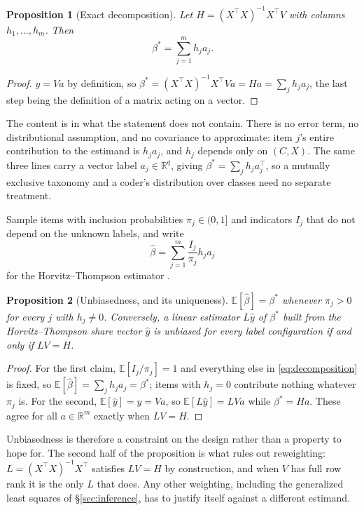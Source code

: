 \documentclass[11pt]{article}
\newcommand{\E}{\mathbb{E}}
\theoremstyle{plain}
\newtheorem{proposition}{Proposition}
\theoremstyle{remark}
\begin{document}
\begin{proposition}[Exact decomposition]
\label{prop:decomposition}
Let $H=(X^\top X)^{-1}X^\top V$ with columns $h_1,\dots,h_m$. Then
\begin{equation}
\label{eq:decomposition}
\beta^*=\sum_{j=1}^m h_j a_j .
\end{equation}
\end{proposition}

\begin{proof}
$y=Va$ by definition, so $\beta^*=(X^\top X)^{-1}X^\top Va=Ha=\sum_j h_ja_j$, the last step being the definition of a matrix acting on a vector.
\end{proof}

The content is in what the statement does not contain. There is no error term, no distributional assumption, and no covariance to approximate: item $j$'s entire contribution to the estimand is $h_ja_j$, and $h_j$ depends only on $(C,X)$. The same three lines carry a vector label $a_j\in\mathbb{R}^q$, giving $\beta^*=\sum_jh_ja_j^\top$, so a mutually exclusive taxonomy and a coder's distribution over classes need no separate treatment.

Sample items with inclusion probabilities $\pi_j\in(0,1]$ and indicators $I_j$ that do not depend on the unknown labels, and write
\begin{equation}
\label{eq:ht}
\widehat\beta=\sum_{j=1}^m \frac{I_j}{\pi_j}h_j a_j
\end{equation}
for the Horvitz--Thompson estimator \citep{HorvitzThompson1952}.

\begin{proposition}[Unbiasedness, and its uniqueness]
\label{prop:unbiased}
$\E[\widehat\beta]=\beta^*$ whenever $\pi_j>0$ for every $j$ with $h_j\neq 0$. Conversely, a linear estimator $L\widehat y$ of $\beta^*$ built from the Horvitz--Thompson share vector $\widehat y$ is unbiased for every label configuration if and only if $LV=H$.
\end{proposition}

\begin{proof}
For the first claim, $\E[I_j/\pi_j]=1$ and everything else in \eqref{eq:decomposition} is fixed, so $\E[\widehat\beta]=\sum_jh_ja_j=\beta^*$; items with $h_j=0$ contribute nothing whatever $\pi_j$ is. For the second, $\E[\widehat y]=y=Va$, so $\E[L\widehat y]=LVa$ while $\beta^*=Ha$. These agree for all $a\in\mathbb{R}^m$ exactly when $LV=H$.
\end{proof}

Unbiasedness is therefore a constraint on the design rather than a property to hope for. The second half of the proposition is what rules out reweighting: $L=(X^\top X)^{-1}X^\top$ satisfies $LV=H$ by construction, and when $V$ has full row rank it is the only $L$ that does. Any other weighting, including the generalized least squares of \S\ref{sec:inference}, has to justify itself against a different estimand.
\end{document}
